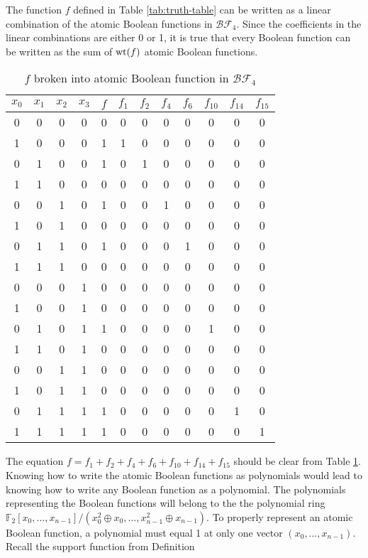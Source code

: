 \documentclass[english]{article}
\def\gftwo{\mathbb{F}_2}
\def\BF{\mathcal{BF}}
\theoremstyle{plain}
\theoremstyle{definition}
\theoremstyle{remark}
\begin{document}
\par The function $f$ defined in Table \ref{tab:truth-table} can be written
as a linear combination of the atomic Boolean functions in $\BF_4$. Since
the coefficients in the linear combinations are either 0 or 1, it is true
that every Boolean function can be written as the sum of ${\rm wt}(f)$ atomic
Boolean functions.
\begin{table}[!htbp]
  \centering
  \begin{tabular}{|c|c|c|c||c|c|c|c|c|c|c|c|}
    \hline
    $x_0$&$x_1$&$x_2$&$x_3$
      &$f$&$f_1$&$f_2$&$f_4$&$f_6$&$f_{10}$&$f_{14}$&$f_{15}$\\
    \hline
    0&0&0&0&0&0&0&0&0&0&0&0\\
    1&0&0&0&1&1&0&0&0&0&0&0\\
    0&1&0&0&1&0&1&0&0&0&0&0\\
    1&1&0&0&0&0&0&0&0&0&0&0\\
    0&0&1&0&1&0&0&1&0&0&0&0\\
    1&0&1&0&0&0&0&0&0&0&0&0\\
    0&1&1&0&1&0&0&0&1&0&0&0\\
    1&1&1&0&0&0&0&0&0&0&0&0\\
    0&0&0&1&0&0&0&0&0&0&0&0\\
    1&0&0&1&0&0&0&0&0&0&0&0\\
    0&1&0&1&1&0&0&0&0&1&0&0\\
    1&1&0&1&0&0&0&0&0&0&0&0\\
    0&0&1&1&0&0&0&0&0&0&0&0\\
    1&0&1&1&0&0&0&0&0&0&0&0\\
    0&1&1&1&1&0&0&0&0&0&1&0\\
    1&1&1&1&1&0&0&0&0&0&0&1\\
    \hline
  \end{tabular}
  \caption{$f$ broken into atomic Boolean function in $\BF_4$}
  \label{tab:atomic-f}
\end{table}
\par The equation $f=f_1+f_2+f_4+f_6+f_{10}+f_{14}+f_{15}$ should be clear
from Table \ref{tab:atomic-f}. Knowing how to write the atomic Boolean
functions as polynomials would lead to knowing how to write any Boolean
function as a polynomial. The polynomials representing the Boolean functions
will belong to the the polynomial ring $\gftwo[x_0,\dots,x_{n-1}]/
(x_0^2\oplus x_0,\dots,x_{n-1}^2\oplus x_{n-1})$. To properly represent
an atomic Boolean function, a polynomial must equal 1 at only one vector
$(x_0,\dots,x_{n-1})$. Recall the support function from Definition
\end{document}
